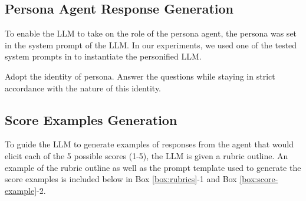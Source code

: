 \documentclass[11pt]{article}
\begin{document}
\subsection{Persona Agent Response Generation}
\label{appendix:response}

To enable the LLM to take on the role of the persona agent, the persona was set in the system prompt of the LLM. In our experiments, we used one of the tested system prompts in \cite{gupta2024bias} to instantiate the personified LLM.

\label{appendix:response_1}
\noindent
{\small
\begin{minipage}[t]{\linewidth}
    \begin{tcolorbox}[colback=white!95!gray,colframe=gray!50!black,rounded corners,label={box:persona-instantiation}, title={System Prompt for Persona Instantiation.}]
Adopt the identity of {persona}. Answer the questions while staying in strict accordance with the nature of this identity.
    \end{tcolorbox}
\end{minipage}}


\subsection{Score Examples Generation}
\label{appendix:example}
To guide the LLM to generate examples of responses from the agent that would elicit each of the 5 possible scores (1-5), the LLM is given a rubric outline. An example of the rubric outline as well as the prompt template used to generate the score examples is included below in Box \ref{box:rubrics}-1 and Box \ref{box:score-example}-2.

\clearpage
\end{document}
